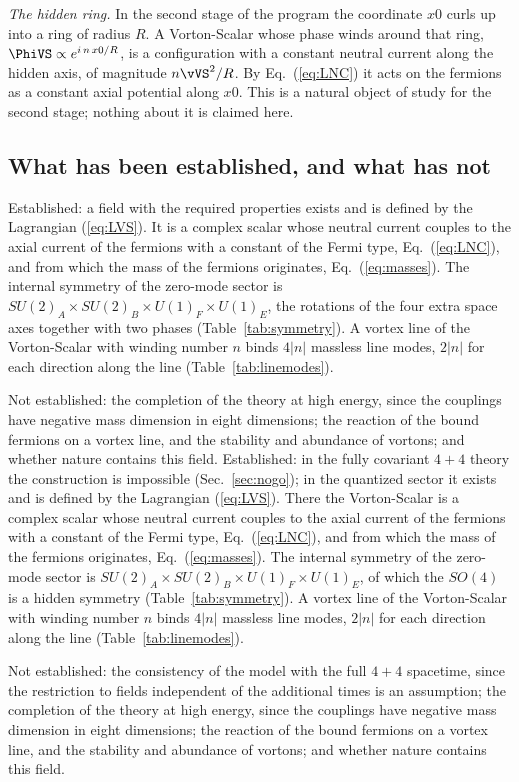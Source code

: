 \emph{The hidden ring.} In the second stage of the program the coordinate $x0$ curls up into a ring of
radius $R$. A Vorton-Scalar whose phase winds around that ring, $\PhiVS\propto e^{i\,n\,x0/R}$, is a
configuration with a constant neutral current along the hidden axis, of magnitude $n\vVS^2/R$. By
Eq.~(\ref{eq:LNC}) it acts on the fermions as a constant axial potential along $x0$. This is a natural
object of study for the second stage; nothing about it is claimed here.

\subsection{What has been established, and what has not}

Established: a field with the required properties exists and is defined by the Lagrangian
(\ref{eq:LVS}). It is a complex scalar whose neutral current couples to the axial current of the
fermions with a constant of the Fermi type, Eq.~(\ref{eq:LNC}), and from which the mass of the
fermions originates, Eq.~(\ref{eq:masses}). The internal symmetry of the zero-mode sector is
$SU(2)_A\times SU(2)_B\times U(1)_F\times U(1)_E$, the rotations of the four extra space axes together
with two phases (Table~\ref{tab:symmetry}). A vortex line of the Vorton-Scalar with winding number
$n$ binds $4|n|$ massless line modes, $2|n|$ for each direction along the line
(Table~\ref{tab:linemodes}).

Not established: the completion of the theory at high energy, since the couplings have negative mass
dimension in eight dimensions; the reaction of the bound fermions on a vortex line, and the
stability and abundance of vortons; and whether nature contains this field.
Established: in the fully covariant $4+4$ theory the construction is impossible
(Sec.~\ref{sec:nogo}); in the quantized sector it exists and is defined by the Lagrangian
(\ref{eq:LVS}). There the Vorton-Scalar is a complex scalar whose neutral current couples to the
axial current of the fermions with a constant of the Fermi type, Eq.~(\ref{eq:LNC}), and from which
the mass of the fermions originates, Eq.~(\ref{eq:masses}). The internal symmetry of the zero-mode
sector is $SU(2)_A\times SU(2)_B\times U(1)_F\times U(1)_E$, of which the $SO(4)$ is a hidden symmetry
(Table~\ref{tab:symmetry}). A vortex line of the Vorton-Scalar with winding number $n$ binds
$4|n|$ massless line modes, $2|n|$ for each direction along the line
(Table~\ref{tab:linemodes}).

Not established: the consistency of the model with the full $4+4$ spacetime, since the restriction to
fields independent of the additional times is an assumption; the completion of the theory at high
energy, since the couplings have negative mass dimension in eight dimensions; the reaction of the
bound fermions on a vortex line, and the stability and abundance of vortons; and whether nature
contains this field.
